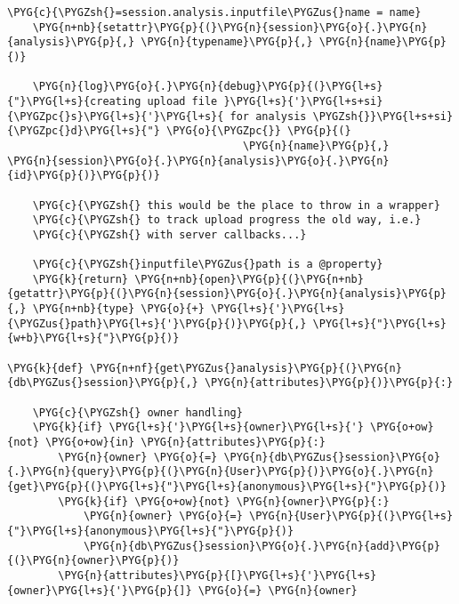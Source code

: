 \begin{Verbatim}[commandchars=\\\{\}]
    \PYG{c}{\PYGZsh{}=session.analysis.inputfile\PYGZus{}name = name}
    \PYG{n+nb}{setattr}\PYG{p}{(}\PYG{n}{session}\PYG{o}{.}\PYG{n}{analysis}\PYG{p}{,} \PYG{n}{typename}\PYG{p}{,} \PYG{n}{name}\PYG{p}{)}

    \PYG{n}{log}\PYG{o}{.}\PYG{n}{debug}\PYG{p}{(}\PYG{l+s}{"}\PYG{l+s}{creating upload file }\PYG{l+s}{'}\PYG{l+s+si}{\PYGZpc{}s}\PYG{l+s}{'}\PYG{l+s}{ for analysis \PYGZsh{}}\PYG{l+s+si}{\PYGZpc{}d}\PYG{l+s}{"} \PYG{o}{\PYGZpc{}} \PYG{p}{(}
                                     \PYG{n}{name}\PYG{p}{,}             \PYG{n}{session}\PYG{o}{.}\PYG{n}{analysis}\PYG{o}{.}\PYG{n}{id}\PYG{p}{)}\PYG{p}{)}

    \PYG{c}{\PYGZsh{} this would be the place to throw in a wrapper}
    \PYG{c}{\PYGZsh{} to track upload progress the old way, i.e.}
    \PYG{c}{\PYGZsh{} with server callbacks...}

    \PYG{c}{\PYGZsh{}inputfile\PYGZus{}path is a @property}
    \PYG{k}{return} \PYG{n+nb}{open}\PYG{p}{(}\PYG{n+nb}{getattr}\PYG{p}{(}\PYG{n}{session}\PYG{o}{.}\PYG{n}{analysis}\PYG{p}{,} \PYG{n+nb}{type} \PYG{o}{+} \PYG{l+s}{'}\PYG{l+s}{\PYGZus{}path}\PYG{l+s}{'}\PYG{p}{)}\PYG{p}{,} \PYG{l+s}{"}\PYG{l+s}{w+b}\PYG{l+s}{"}\PYG{p}{)}

\PYG{k}{def} \PYG{n+nf}{get\PYGZus{}analysis}\PYG{p}{(}\PYG{n}{db\PYGZus{}session}\PYG{p}{,} \PYG{n}{attributes}\PYG{p}{)}\PYG{p}{:}

    \PYG{c}{\PYGZsh{} owner handling}
    \PYG{k}{if} \PYG{l+s}{'}\PYG{l+s}{owner}\PYG{l+s}{'} \PYG{o+ow}{not} \PYG{o+ow}{in} \PYG{n}{attributes}\PYG{p}{:}
        \PYG{n}{owner} \PYG{o}{=} \PYG{n}{db\PYGZus{}session}\PYG{o}{.}\PYG{n}{query}\PYG{p}{(}\PYG{n}{User}\PYG{p}{)}\PYG{o}{.}\PYG{n}{get}\PYG{p}{(}\PYG{l+s}{"}\PYG{l+s}{anonymous}\PYG{l+s}{"}\PYG{p}{)}
        \PYG{k}{if} \PYG{o+ow}{not} \PYG{n}{owner}\PYG{p}{:}
            \PYG{n}{owner} \PYG{o}{=} \PYG{n}{User}\PYG{p}{(}\PYG{l+s}{"}\PYG{l+s}{anonymous}\PYG{l+s}{"}\PYG{p}{)}
            \PYG{n}{db\PYGZus{}session}\PYG{o}{.}\PYG{n}{add}\PYG{p}{(}\PYG{n}{owner}\PYG{p}{)}
        \PYG{n}{attributes}\PYG{p}{[}\PYG{l+s}{'}\PYG{l+s}{owner}\PYG{l+s}{'}\PYG{p}{]} \PYG{o}{=} \PYG{n}{owner}


\end{Verbatim}
